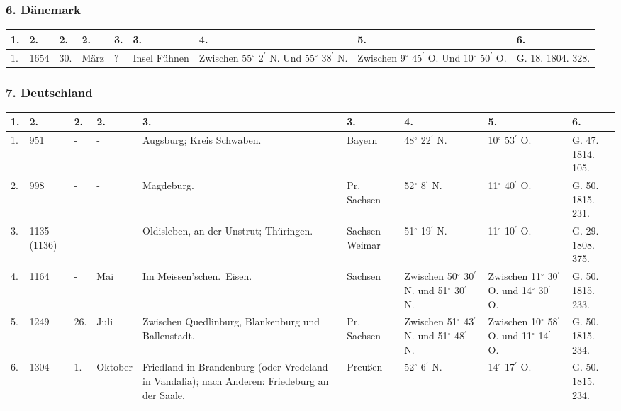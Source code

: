 \documentclass[a4paper, 8pt, oneside, polutonikogreek, german]{article}
\begin{document}
\subsubsection{6. Dänemark}
\begin{table}[!ht]
    \centering
    \begin{tabular}{|l|l|l|l|l|l|l|l|p{13mm}|}
    \hline
        1. & 2. & 2. & 2. & 3. & 3. & 4. & 5. & 6. \\ \hline
        1. & 1654 & 30. & März & ? & Insel Fühnen & Zwischen 55$^\circ$ 2$^\prime$ N. Und 55$^\circ$ 38$^\prime$ N. & Zwischen 9$^\circ$ 45$^\prime$ O. Und 10$^\circ$ 50$^\prime$ O. & G. 18. 1804. 328. \\ \hline
    \end{tabular}
\end{table}
\clearpage
\subsubsection{7. Deutschland}
\begin{table}[!ht]
    \centering
    \begin{tabular}{|p{5mm}|p{9mm}|p{5mm}|p{15mm}|p{48mm}|p{20mm}|p{18mm}|p{18mm}|p{11mm}|}
    \hline
        1. & 2. & 2. & 2. & 3. & 3. & 4. & 5. & 6. \\ \hline
        1. & 951 & - & - & Augsburg; Kreis Schwaben. & Bayern & 48$^\circ$ 22$^\prime$ N. & 10$^\circ$ 53$^\prime$ O. & G. 47. 1814. 105. \\ \hline
        2. & 998 & - & - & Magdeburg. & Pr. Sachsen & 52$^\circ$ 8$^\prime$ N. & 11$^\circ$ 40$^\prime$ O. & G. 50. 1815. 231. \\ \hline
        3. & 1135 (1136) & - & - & Oldisleben, an der Unstrut; Thüringen. & Sachsen-Weimar & 51$^\circ$ 19$^\prime$ N. & 11$^\circ$ 10$^\prime$ O. & G. 29. 1808. 375. \\ \hline
        4. & 1164 & - & Mai & Im Meissen’schen. Eisen. & Sachsen & Zwischen 50$^\circ$ 30$^\prime$ N. und 51$^\circ$ 30$^\prime$ N. & Zwischen 11$^\circ$ 30$^\prime$ O. und 14$^\circ$ 30$^\prime$ O. & G. 50. 1815. 233. \\ \hline
        5. & 1249 & 26. & Juli & Zwischen Quedlinburg, Blankenburg und Ballenstadt. & Pr. Sachsen & Zwischen 51$^\circ$ 43$^\prime$ N. und 51$^\circ$ 48$^\prime$ N. & Zwischen 10$^\circ$ 58$^\prime$ O. und 11$^\circ$ 14$^\prime$ O. & G. 50. 1815. 234. \\ \hline
        6. & 1304 & 1. & Oktober & Friedland in Brandenburg (oder Vredeland in Vandalia); nach Anderen: Friedeburg an der Saale. & Preußen & 52$^\circ$ 6$^\prime$ N. & 14$^\circ$ 17$^\prime$ O. & G. 50. 1815. 234. \\ \hline
    \end{tabular}
\end{table}
\end{document}
